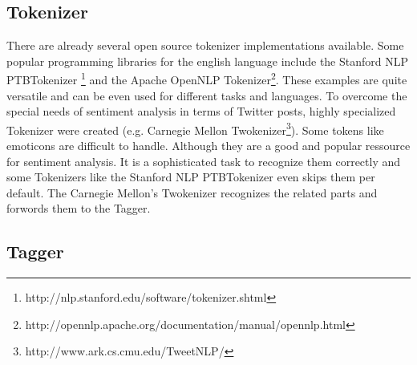 \subsection{Tokenizer}
There are already several open source tokenizer implementations
available. Some popular programming libraries for the english 
language include the Stanford NLP PTBTokenizer
\footnote{http://nlp.stanford.edu/software/tokenizer.shtml} 
and the Apache OpenNLP Tokenizer\footnote{http://opennlp.apache.org/documentation/manual/opennlp.html}.
These examples are quite versatile and can be even 
used for different tasks and languages.
To overcome the special needs of sentiment analysis in terms of Twitter posts,
highly specialized Tokenizer were created (e.g. Carnegie 
Mellon Twokenizer\footnote{http://www.ark.cs.cmu.edu/TweetNLP/}).
Some tokens like emoticons are difficult to handle. Although they 
are a good and popular ressource for sentiment analysis. \autocite{emoticons}
It is a sophisticated task to recognize them correctly and some Tokenizers 
like the Stanford NLP PTBTokenizer even skips them per default. 
The Carnegie Mellon's Twokenizer recognizes the related parts and
forwords them to the Tagger.

\subsection{Tagger}
